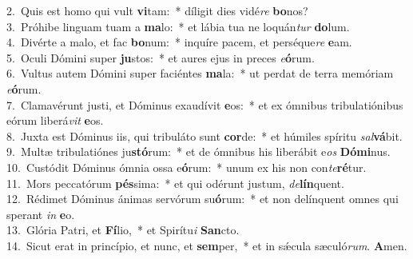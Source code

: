 {2.~}Quis est homo qui vult \textbf{vi}tam:~* díligit dies vidé\textit{re} \textbf{bo}nos?\\
{3.~}Próhibe linguam tuam a \textbf{ma}lo:~* et lábia tua ne loquán\textit{tur} \textbf{do}lum.\\
{4.~}Divérte a malo, et fac \textbf{bo}num:~* inquíre pacem, et perséque\textit{re} \textbf{e}am.\\
{5.~}Oculi Dómini super \textbf{ju}stos:~* et aures ejus in preces \textit{e}\textbf{ó}rum.\\
{6.~}Vultus autem Dómini super faciéntes \textbf{ma}la:~* ut perdat de terra memóriam \textit{e}\textbf{ó}rum.\\
{7.~}Clamavérunt justi, et Dóminus exaudívit \textbf{e}os:~* et ex ómnibus tribulatiónibus eórum liberá\textit{vit} \textbf{e}os.\\
{8.~}Juxta est Dóminus iis, qui tribuláto sunt \textbf{cor}de:~* et húmiles spíritu \textit{sal}\textbf{vá}bit.\\
{9.~}Multæ tribulatiónes ju\textbf{stó}rum:~* et de ómnibus his liberábit e\textit{os} \textbf{Dó}\textbf{mi}nus.\\
{10.~}Custódit Dóminus ómnia ossa e\textbf{ó}rum:~* unum ex his non con\textit{te}\textbf{ré}tur.\\
{11.~}Mors peccatórum \textbf{pés}sima:~* et qui odérunt justum, \textit{de}\textbf{lín}quent.\\
{12.~}Rédimet Dóminus ánimas servórum su\textbf{ó}rum:~* et non delínquent omnes qui sperant \textit{in} \textbf{e}o.\\
{13.~}Glória Patri, et \textbf{Fí}lio,~* et Spirítu\textit{i} \textbf{San}cto.\\
{14.~}Sicut erat in princípio, et nunc, et \textbf{sem}per,~* et in sǽcula sæculó\textit{rum}. \textbf{A}men.\\
